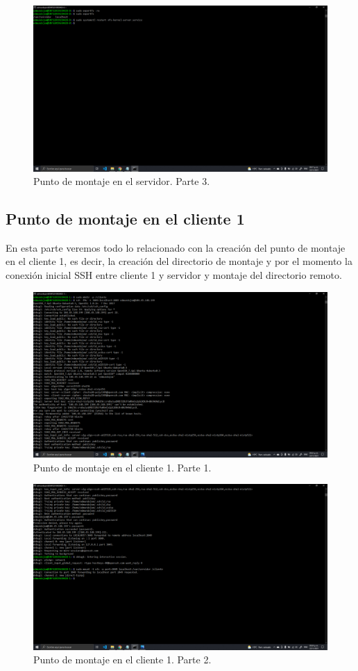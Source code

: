 \documentclass[11pt]{article}
\begin{document}
		\begin{figure}[H]
			\centering
			\includegraphics[scale=0.34]{resources/servidor3.png}
			\caption{Punto de montaje en el servidor. Parte 3.}\label{fig:picture}
		\end{figure}	
		\subsection{Punto de montaje en el cliente 1}
		En esta parte veremos todo lo relacionado con la creación del punto de montaje en el cliente 1, es decir, la creación del directorio de montaje y por el momento la conexión inicial SSH entre cliente 1 y servidor y montaje del directorio remoto.
		\begin{figure}[H]
			\centering
			\includegraphics[scale=0.34]{resources/cliente1.1.png}
			\caption{Punto de montaje en el cliente 1. Parte 1.}\label{fig:picture}
		\end{figure}
		\begin{figure}[H]
			\centering
			\includegraphics[scale=0.34]{resources/cliente1.2.png}
			\caption{Punto de montaje en el cliente 1. Parte 2.}\label{fig:picture}
		\end{figure}
\end{document}
